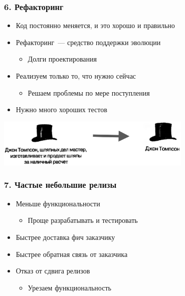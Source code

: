 \documentclass{../../slides-style}
\begin{document}
    \begin{frame}
        \frametitle{6. Рефакторинг}
        \begin{itemize}
            \item Код постоянно меняется, и это хорошо и правильно
            \item Рефакторинг~--- средство поддержки эволюции
            \begin{itemize}
                \item Долги проектирования
            \end{itemize}
            \item Реализуем только то, что нужно сейчас
            \begin{itemize}
                \item Решаем проблемы по мере поступления
            \end{itemize}
            \item Нужно много хороших тестов
        \end{itemize}
        \begin{center}
            \includegraphics[width=0.7\textwidth]{hatsRefactoring.png}
        \end{center}
    \end{frame}

    \begin{frame}
        \frametitle{7. Частые небольшие релизы}
        \begin{itemize}
            \item Меньше функциональности
            \begin{itemize}
                \item Проще разрабатывать и тестировать
            \end{itemize}
            \item Быстрее доставка фич заказчику
            \item Быстрее обратная связь от заказчика
            \item Отказ от сдвига релизов
            \begin{itemize}
                \item Урезаем функциональность
            \end{itemize}
        \end{itemize}
    \end{frame}
\end{document}
